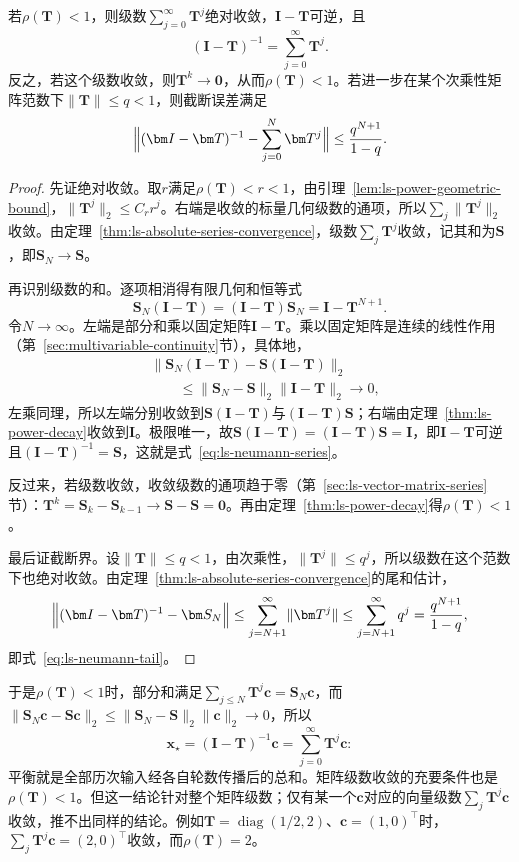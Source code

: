 \begin{theorem}[Neumann级数与逆]
\label{thm:ls-neumann}
若$\rho(\bm T)<1$，则级数$\sum_{j=0}^{\infty}\bm T^j$绝对收敛，$\bm I-\bm T$可逆，且
\begin{equation}
 (\bm I-\bm T)^{-1}=\sum_{j=0}^{\infty}\bm T^j .
 \label{eq:ls-neumann-series}
\end{equation}
反之，若这个级数收敛，则$\bm T^k\to\bm0$，从而$\rho(\bm T)<1$。若进一步在某个次乘性矩阵范数下$\lVert\bm T\rVert\leq q<1$，则截断误差满足
\begin{equation}
 \Bigl\lVert(\bm I-\bm T)^{-1}-\sum_{j=0}^{N}\bm T^j\Bigr\rVert\leq\frac{q^{N+1}}{1-q}.
 \label{eq:ls-neumann-tail}
\end{equation}
\end{theorem}
\begin{proof}
先证绝对收敛。取$r$满足$\rho(\bm T)<r<1$，由引理~\ref{lem:ls-power-geometric-bound}，$\lVert\bm T^j\rVert_2\leq C_rr^j$。右端是收敛的标量几何级数的通项，所以$\sum_j\lVert\bm T^j\rVert_2$收敛。由定理~\ref{thm:ls-absolute-series-convergence}，级数$\sum_j\bm T^j$收敛，记其和为$\bm S$，即$\bm S_N\to\bm S$。

再识别级数的和。逐项相消得有限几何和恒等式
\[
 \bm S_N(\bm I-\bm T)=(\bm I-\bm T)\bm S_N=\bm I-\bm T^{N+1}.
\]
令$N\to\infty$。左端是部分和乘以固定矩阵$\bm I-\bm T$。乘以固定矩阵是连续的线性作用（第~\ref{sec:multivariable-continuity}节），具体地，
\[
\begin{aligned}
 &\lVert\bm S_N(\bm I-\bm T)-\bm S(\bm I-\bm T)\rVert_2\\
 &\qquad\leq\lVert\bm S_N-\bm S\rVert_2\lVert\bm I-\bm T\rVert_2\to0 ,
\end{aligned}
\]
左乘同理，所以左端分别收敛到$\bm S(\bm I-\bm T)$与$(\bm I-\bm T)\bm S$；右端由定理~\ref{thm:ls-power-decay}收敛到$\bm I$。极限唯一，故$\bm S(\bm I-\bm T)=(\bm I-\bm T)\bm S=\bm I$，即$\bm I-\bm T$可逆且$(\bm I-\bm T)^{-1}=\bm S$，这就是式~\eqref{eq:ls-neumann-series}。

反过来，若级数收敛，收敛级数的通项趋于零（第~\ref{sec:ls-vector-matrix-series}节）：$\bm T^k=\bm S_k-\bm S_{k-1}\to\bm S-\bm S=\bm0$。再由定理~\ref{thm:ls-power-decay}得$\rho(\bm T)<1$。

最后证截断界。设$\lVert\bm T\rVert\leq q<1$，由次乘性，$\lVert\bm T^j\rVert\leq q^j$，所以级数在这个范数下也绝对收敛。由定理~\ref{thm:ls-absolute-series-convergence}的尾和估计，
\[
 \Bigl\lVert(\bm I-\bm T)^{-1}-\bm S_N\Bigr\rVert
 \leq\sum_{j=N+1}^{\infty}\lVert\bm T^j\rVert
 \leq\sum_{j=N+1}^{\infty}q^j=\frac{q^{N+1}}{1-q},
\]
即式~\eqref{eq:ls-neumann-tail}。
\end{proof}
于是$\rho(\bm T)<1$时，部分和满足$\sum_{j\leq N}\bm T^j\bm c=\bm S_N\bm c$，而$\lVert\bm S_N\bm c-\bm S\bm c\rVert_2\leq\lVert\bm S_N-\bm S\rVert_2\lVert\bm c\rVert_2\to0$，所以
\[
 \bm x_\star=(\bm I-\bm T)^{-1}\bm c=\sum_{j=0}^{\infty}\bm T^j\bm c :
\]
平衡就是全部历次输入经各自轮数传播后的总和。矩阵级数收敛的充要条件也是$\rho(\bm T)<1$。但这一结论针对整个矩阵级数；仅有某一个$\bm c$对应的向量级数$\sum_j\bm T^j\bm c$收敛，推不出同样的结论。例如$\bm T=\operatorname{diag}(1/2,2)$、$\bm c=(1,0)^\top$时，$\sum_j\bm T^j\bm c=(2,0)^\top$收敛，而$\rho(\bm T)=2$。

